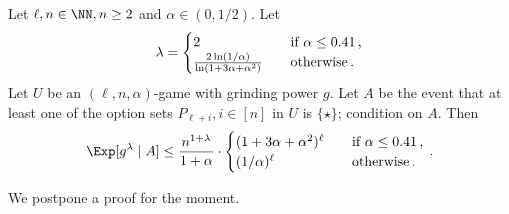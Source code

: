     \begin{theorem}\label{thm:xor-game-private-election}
        Let $\ell, n \in \NN, n \geq 2$ and $\alpha \in (0, 1/2)$. 
        Let
        \begin{equation}\label{eq:lambda-star-poisson}
            \lambda = \begin{cases}
                2 & \quad\text{if $\alpha \leq 0.41$\,,}\\
                \frac{2 \ln(1/\alpha)}{\ln(1+3\alpha+\alpha^2)} &\quad\text{otherwise\,.}
            \end{cases}
        \end{equation}
        Let $U$ be an $(\ell, n, \alpha)$-game with grinding power $g$. 
        Let $A$ be the event that 
        at least one of the option sets $P_{\ell + i}, i \in [n]$ in $U$ is $\{\star\}$; 
        condition on $A$. 
        Then 
        $$
            \Exp[g^\lambda \mid A] 
            \leq \frac{n^{1 + \lambda} }{1+\alpha} 
            \cdot \begin{cases}
                (1 + 3 \alpha + \alpha^2)^{\ell} &\quad\text{if $\alpha \leq 0.41$\,,} \\
                (1/\alpha)^\ell &\quad\text{otherwise\,.}
            \end{cases}
            \,.
        $$
    \end{theorem}
    We postpone a proof for the moment.



